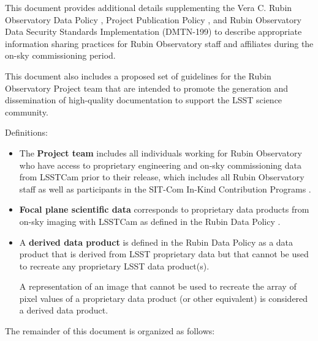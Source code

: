 \documentclass[SE,authoryear,toc,lsstdraft]{lsstdoc}
\begin{document}
This document provides additional details supplementing the Vera C. Rubin Observatory Data Policy , Project Publication Policy , and Rubin Observatory Data Security Standards Implementation (DMTN-199) to describe appropriate information sharing practices for Rubin Observatory staff and affiliates during the on-sky commissioning period.

This document also includes a proposed set of guidelines for the Rubin Observatory Project team that are intended to promote the generation and dissemination of high-quality documentation to support the LSST science community.

Definitions:

\begin{itemize}

  \item The \textbf{Project team} includes all individuals working for Rubin Observatory who have access to proprietary engineering and on-sky commissioning data from LSSTCam prior to their release, which includes all Rubin Observatory staff as well as participants in the SIT-Com In-Kind Contribution Programs .

  \item \textbf{Focal plane scientific data} corresponds to proprietary data products from on-sky imaging with LSSTCam as defined in the Rubin Data Policy .

  \item A \textbf{derived data product} is defined in the Rubin Data Policy  as a data product that is derived from LSST proprietary data but that cannot be used to recreate any proprietary LSST data product(s).

  A representation of an image that cannot be used to recreate the array of pixel values of a proprietary data product (or other equivalent) is considered a derived data product.

\end{itemize}

The remainder of this document is organized as follows:
\end{document}
